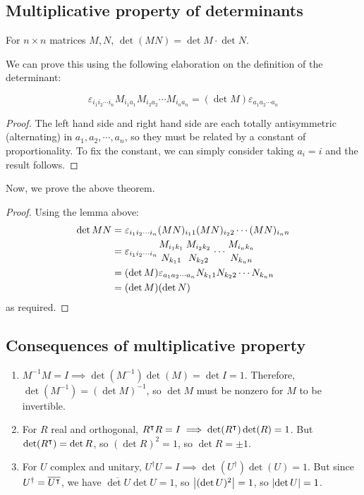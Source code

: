 \subsection{Multiplicative property of determinants}
\begin{theorem}
	For \(n\times n\) matrices \(M, N\), \(\det (MN) = \det M \cdot \det N\).
\end{theorem}
We can prove this using the following elaboration on the definition of the determinant:
\begin{lemma}
	\[
		\varepsilon_{i_1 i_2 \cdots i_n} M_{i_1 a_1} M_{i_2 a_2} \cdots M_{i_n a_n} = (\det M) \varepsilon_{a_1 a_2 \cdots a_n}
	\]
\end{lemma}
\begin{proof}
	The left hand side and right hand side are each totally antisymmetric (alternating) in \(a_1, a_2, \cdots, a_n\), so they must be related by a constant of proportionality.
	To fix the constant, we can simply consider taking \(a_i = i\) and the result follows.
\end{proof}
Now, we prove the above theorem.
\begin{proof}
	Using the lemma above:
	\begin{align*}
		\det MN & = \varepsilon_{i_1 i_2 \cdots i_n} (MN)_{i_1 1} (MN)_{i_2 2} \cdots (MN)_{i_n n}                                                    \\
		        & = \varepsilon_{i_1 i_2 \cdots i_n} {M_{i_1 k_1} \atop N_{k_1 1}} {M_{i_2 k_2} \atop N_{k_2 2}} \cdots {M_{i_n k_n} \atop N_{k_n n}} \\
		        & = (\det M) \varepsilon_{a_1 a_2 \cdots a_n} N_{k_1 1} N_{k_2 2} \cdots N_{k_n n}                                                    \\
		        & = (\det M)(\det N)
	\end{align*}
	as required.
\end{proof}

\subsection{Consequences of multiplicative property}
\begin{enumerate}
	\item \(M^{-1}M = I \implies \det(M^{-1}) \det(M) = \det I = 1\).
	      Therefore, \(\det (M^{-1}) = (\det M)^{-1}\), so \(\det M\) must be nonzero for \(M\) to be invertible.
	\item For \(R\) real and orthogonal, \(R^\intercal R = I \implies \det(R^\intercal) \det(R) = 1\).
	      But \(\det (R^\intercal) = \det R\), so \((\det R)^2 = 1\), so \(\det R = \pm 1\).
	\item For \(U\) complex and unitary, \(U^\dagger U = I \implies \det(U^\dagger) \det(U) = 1\).
	      But since \(U^\dagger = \overline{U^\intercal}\), we have \(\overline{\det U} \det U = 1\), so \(\abs{(\det U)^2} = 1\), so \(\abs{\det U} = 1\).
\end{enumerate}

